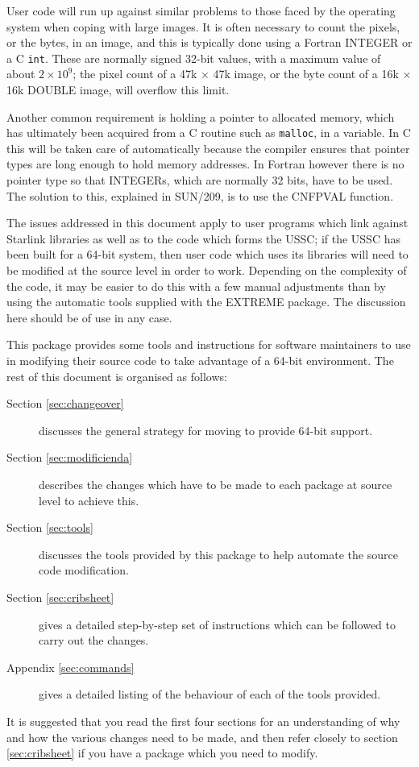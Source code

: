 \documentclass[twoside,11pt]{article}
\newcommand{\xref}[3]{#1}
\renewcommand{\_}{\texttt{\symbol{95}}}
\newcommand{\cc}[1]{{\tt #1}}
\begin{document}
User code will run up against similar problems to those faced by
the operating system when coping with large images.
It is often necessary to count the pixels, or the bytes,
in an image, and this is typically done using a Fortran INTEGER
or a C \cc{int}.  These are normally signed 32-bit values, with
a maximum value of about $2 \times 10^9$; the pixel count of a 
47k $\times$ 47k image, or the byte count of a 16k $\times$ 16k 
\_DOUBLE image, will overflow this limit.

Another common requirement is holding a pointer 
to allocated memory, which has ultimately been 
acquired from a C routine such as \cc{malloc}, 
in a variable.
In C this will be taken care of automatically because the compiler
ensures that pointer types are long enough to hold memory addresses.
In Fortran however there is no pointer type so that INTEGERs, which are
normally 32 bits, have to be used.
The solution to this, explained in \xref{SUN/209}{sun209}{pointers},
is to use the \xref{CNF\_PVAL}{sun209}{CNF\_PVAL} function.

The issues addressed in this document apply to user programs which link
against Starlink libraries as well as to the code which forms the USSC;
if the USSC has been built for a 64-bit system, then user code 
which uses its libraries will need to be modified at the 
source level in order to work.
Depending on the complexity of the code, it may be easier to do this
with a few manual adjustments than by using the automatic 
tools supplied with the EXTREME package.  
The discussion here should be of use in any case.

This package provides some tools and instructions for 
software maintainers to use 
in modifying their source code to take advantage of a 64-bit environment.
The rest of this document is organised as follows:
\begin{description}
%
\item[Section \ref{sec:changeover}]
discusses the general strategy for moving to provide 64-bit support.
%
\item[Section \ref{sec:modificienda}]
describes the changes which have to be made to each package at 
source level to achieve this.
%
\item[Section \ref{sec:tools}]
discusses the tools provided by this package to help automate 
the source code modification.
%
\item[Section \ref{sec:cribsheet}]
gives a detailed step-by-step set of instructions which can be followed 
to carry out the changes.
%
\item[Appendix \ref{sec:commands}]
gives a detailed listing of the behaviour of each of the tools provided.
%
\end{description}
It is suggested that you read the first four sections
for an understanding of why and how the various changes need to be 
made, and then refer closely to section \ref{sec:cribsheet}
if you have a package which you need to modify.
\end{document}
